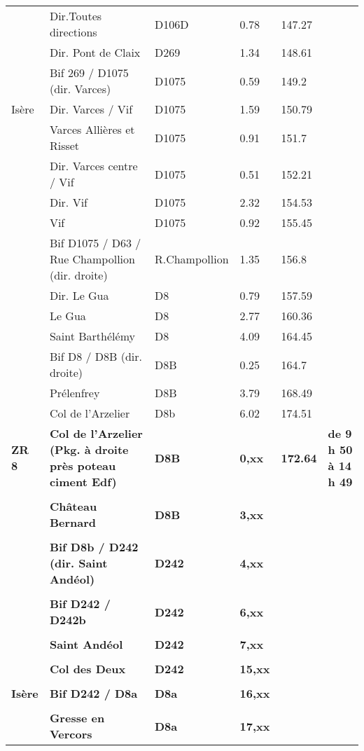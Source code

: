 \documentclass{article}%
\begin{document}
\begin{longtable}{p{2.25cm}|p{6.7cm}|p{2.0cm}|p{1.5cm}|p{1.5cm}|p{3.5cm}}
 &Dir.Toutes directions&D106D&0.78&147.27& \\%
 &Dir. Pont de Claix&D269&1.34&148.61& \\%
 &Bif 269 / D1075 (dir. Varces)&D1075&0.59&149.2& \\%
Isère&Dir. Varces / Vif&D1075&1.59&150.79& \\%
 &Varces Allières et Risset &D1075&0.91&151.7& \\%
 &Dir. Varces centre / Vif&D1075&0.51&152.21& \\%
 &Dir. Vif&D1075&2.32&154.53& \\%
 &Vif &D1075&0.92&155.45& \\%
 &Bif D1075 / D63 / Rue Champollion (dir. droite)&R.Champollion &1.35&156.8& \\%
 &Dir. Le Gua&D8&0.79&157.59& \\%
 &Le Gua&D8&2.77&160.36& \\%
 &Saint Barthélémy&D8&4.09&164.45& \\%
 &Bif D8 / D8B (dir. droite)&D8B&0.25&164.7& \\%
 &Prélenfrey&D8B&3.79&168.49& \\%
 &Col de l'Arzelier&D8b&6.02&174.51& \\%
\textbf{ZR 8}&\textbf{Col de l'Arzelier (Pkg. à droite près poteau ciment Edf)}&\textbf{D8B}&\textbf{0,xx}&\textbf{172.64}&\textbf{de 9 h 50 à 14 h 49}\\%
 & & & & & \\%
 &\textbf{Château Bernard }&\textbf{D8B}&\textbf{3,xx}& & \\%
 & & & & & \\%
\textbf{ }&\textbf{Bif D8b / D242 (dir. Saint Andéol)}&\textbf{D242 }&\textbf{4,xx}& & \\%
 & & & & & \\%
 &\textbf{Bif D242 / D242b}&\textbf{D242 }&\textbf{6,xx}& & \\%
 & & & & & \\%
 &\textbf{Saint Andéol }&\textbf{D242 }&\textbf{7,xx}& & \\%
 & & & & & \\%
 &\textbf{Col des Deux}&\textbf{D242 }&\textbf{15,xx}& & \\%
 & & & & & \\%
\textbf{Isère}&\textbf{Bif D242 / D8a}&\textbf{D8a}&\textbf{16,xx}& & \\%
 & & & & & \\%
 &\textbf{Gresse en Vercors }&\textbf{D8a}&\textbf{17,xx}& & \\%

\end{longtable}
\end{document}
